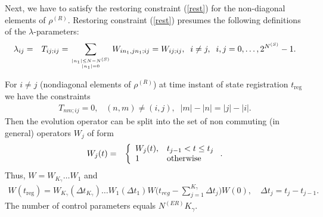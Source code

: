 \documentclass[pra,preprint,showpacs]{revtex4-1}
\begin{document}
 Next, we have to satisfy the restoring constraint (\ref{rest}) for the non-diagonal elements of $\rho^{(R)}$.
Restoring constraint  (\ref{rest})  presumes  the following definitions of  the $\lambda$-parameters:
\begin{eqnarray}\label{K}
\lambda_{ij} &=&T_{ij;ij}=\sum_{{|n_1|\le N-N^{(S)}}\atop{|n_1|=0}}W_{i n_1,jn_1 ;ij}  =W_{ij;ij}  ,\;\; i\neq j,\;\; i,j=0,\dots,2^{N^{(S)}}-1.
\end{eqnarray}
\iffalse
In particular,
\begin{eqnarray}\label{K1}
\lambda_{0j} &=&T_{0j;0j}=\sum_{n_1 =0}^{2^{N-N^{(S)}}-1}W_{0 n_1,jn_1 ;0j}=W_{0j ;0j}   ,\;\;j=0,\dots,2^{N^{(S)}}-1.
\end{eqnarray}
For 1-excitation block we have
\begin{eqnarray}\label{K2}
\lambda_{ij} &=&T_{ij;ij}=\sum_{n_1 =0}^{2^{N-N^{(S)}}-1}W_{i n_1,jn_1 ;0j}=W_{i j ;ij}   ,\;\;i,j=0,\dots,2^{N^{(S)}}-1.
\end{eqnarray}
\fi
For $i\neq j $ (nondiagonal elements of $\rho^{(R)}$) at time instant of state registration $t_{\mathrm{reg}}$ we have the constraints
\begin{eqnarray}\label{constr0}\label{P1}
T_{nm;ij}=0, \;\;\;(n,m)\neq (i,j), \;\;|m|-|n|=|j|-|i|.
\end{eqnarray}
 Then the evolution operator can be split into the set of non commuting (in general) operators $W_j$ of form
\begin{eqnarray}\label{VV}
W_j(t) &=& \left\{
\begin{array}{ll}
W_j(t) ,& t_{j-1} < t\le t_j\cr
1  & {\mbox{otherwise}}
\end{array}
\right..
\end{eqnarray}
Thus, $W = W_{K_\gamma}\dots W_1$ and
\begin{eqnarray}\label{UtK}
W(t_{\mathrm{reg}})=  W_{K_\gamma}(\Delta t_{K_\gamma})\dots W_1(\Delta t_1) W\Big(t_{reg} - \sum_{j=1}^{K_\gamma} \Delta t_j\Big) W(0),\quad  \Delta t_j = t_j -t_{j-1}.
\end{eqnarray}
The number of control parameters equals $N^{(ER)} K_\gamma$.
\end{document}
